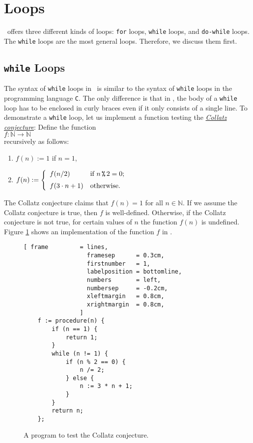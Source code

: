 \section{Loops}
\setlx\ offers three different kinds of loops: \texttt{for} loops, \texttt{while} loops, and
\texttt{do-while} loops.  The \texttt{while} loops are the most general loops.  Therefore, we discuss them first.  

\subsection{\texttt{while} Loops}
The syntax of \texttt{while} loops in \setlx\ is similar to the syntax of
\texttt{while} loops in the programming language \texttt{C}.  The only difference is that in \setlx,
the body of a \texttt{while} loop has to be enclosed in curly braces even if it only consists of a single line.
To demonstrate a \texttt{while} loop,
let us implement a function testing the 
\href{http://en.wikipedia.org/wiki/Collatz_conjecture}{\emph{Collatz conjecture}}:  Define the function
\\[0.2cm]
\hspace*{1.3cm}
$f: \mathbb{N} \rightarrow \mathbb{N}$
\\[0.2cm]
recursively as follows:
\begin{enumerate}
\item $f(n) := 1$ \hspace*{2.13cm} if $n = 1$,
\item $f(n) := \left\{
       \begin{array}[c]{ll}
         f(n/2)           & \mbox{if $n \,\texttt{\symbol{37}}\, 2 = 0$;} \\[0.2cm]  
         f(3 \cdot n + 1) & \mbox{otherwise.} 
       \end{array}
       \right.
      $ 
\end{enumerate}
The Collatz conjecture claims that $f(n) = 1$  for all $n \in \mathbb{N}$. 
If we assume the Collatz conjecture is true, then $f$ is well-defined.
Otherwise, if the Collatz conjecture is not true, for certain values of $n$ the function $f(n)$ is undefined.
Figure \ref{fig:ulam.stlx} shows an implementation of the function $f$ in \setlx.  

\begin{figure}[!ht]
\centering
\begin{Verbatim}[ frame         = lines, 
                  framesep      = 0.3cm, 
                  firstnumber   = 1,
                  labelposition = bottomline,
                  numbers       = left,
                  numbersep     = -0.2cm,
                  xleftmargin   = 0.8cm,
                  xrightmargin  = 0.8cm,
                ]
    f := procedure(n) {
        if (n == 1) {
            return 1;   
        }
        while (n != 1) {
            if (n % 2 == 0) {
                n /= 2;
            } else {
                n := 3 * n + 1;
            }
        }
        return n;
    };
\end{Verbatim}
\vspace*{-0.3cm}
\caption{A program to test the Collatz conjecture.}
\label{fig:ulam.stlx}
\end{figure}

